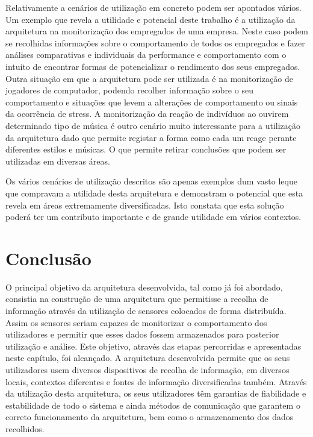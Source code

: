 Relativamente a cenários de utilização em concreto podem ser apontados vários. Um exemplo que revela a utilidade e potencial deste trabalho é a utilização da arquitetura na monitorização dos empregados de uma empresa. Neste caso podem se recolhidas informações sobre o comportamento de todos os empregados e fazer análises comparativas e individuais da performance e comportamento com o intuito de encontrar formas de potencializar o rendimento dos seus empregados. Outra situação em que a arquitetura pode ser utilizada é na monitorização de jogadores de computador, podendo recolher informação sobre o seu comportamento e situações que levem a alterações de comportamento ou sinais da ocorrência de stress. A monitorização da reação de indivíduos ao ouvirem determinado tipo de música é outro cenário muito interessante para a utilização da arquitetura dado que permite registar a forma como cada um reage perante diferentes estilos e músicas. O que permite retirar conclusões que podem ser utilizadas em diversas áreas.

Os vários cenários de utilização descritos são apenas exemplos dum vasto leque que compravam a utilidade desta arquitetura e demonstram o potencial que esta revela em áreas extremamente diversificadas. Isto constata que esta solução poderá ter um contributo importante e de grande utilidade em vários contextos.

\section{Conclusão}

O principal objetivo da arquitetura desenvolvida, tal como já foi abordado, consistia na construção de uma arquitetura que permitisse a recolha de informação através da utilização de sensores colocados de forma distribuída. Assim os sensores seriam capazes de monitorizar o comportamento dos utilizadores e permitir que esses dados fossem armazenados para posterior utilização e análise. Este objetivo, através das etapas percorridas e apresentadas neste capítulo, foi alcançado. A arquitetura desenvolvida permite que os seus utilizadores usem diversos dispositivos de recolha de informação, em diversos locais, contextos diferentes e fontes de informação diversificadas também. Através da utilização desta arquitetura, os seus utilizadores têm garantias de fiabilidade e estabilidade de todo o sistema e ainda métodos de comunicação que garantem o correto funcionamento da arquitetura, bem como o armazenamento dos dados recolhidos.

